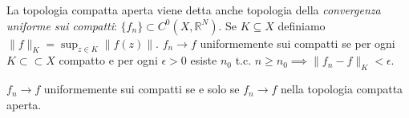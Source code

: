La topologia compatta aperta viene detta anche topologia della \textit{convergenza uniforme sui compatti}: $\{f_n\} \subset C^0(X, \mathbb{R}^N)$. Se $K \subseteq X$ definiamo $\displaystyle \|f\|_K=\sup_{z \in K} \|f(z)\|$.
$f_n \rightarrow f$ uniformemente sui compatti se per ogni $K \subset \subset X$ compatto e per ogni $\epsilon>0$ esiste $n_0$ t.c. $n \ge n_0 \implies \|f_n-f\|_K<\epsilon$.

\begin{exc}
  $f_n \rightarrow f$ uniformemente sui compatti se e solo se $f_n \rightarrow f$ nella topologia compatta aperta.
\end{exc}

